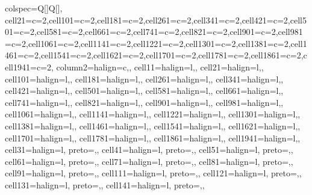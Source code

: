 \begin{table}
\centering
\begin{talltblr}[         %
caption={Technology Adoption Models:  Germany},
note{}={* p \num{< 0.1}, ** p \num{< 0.05}, *** p \num{< 0.01}},
note{ }={* p < 0.1, ** p < 0.05, *** p < 0.01},
]                     %
{                     %
colspec={Q[]Q[]},
cell{2}{1}={c=2}{},cell{10}{1}={c=2}{},cell{18}{1}={c=2}{},cell{26}{1}={c=2}{},cell{34}{1}={c=2}{},cell{42}{1}={c=2}{},cell{50}{1}={c=2}{},cell{58}{1}={c=2}{},cell{66}{1}={c=2}{},cell{74}{1}={c=2}{},cell{82}{1}={c=2}{},cell{90}{1}={c=2}{},cell{98}{1}={c=2}{},cell{106}{1}={c=2}{},cell{114}{1}={c=2}{},cell{122}{1}={c=2}{},cell{130}{1}={c=2}{},cell{138}{1}={c=2}{},cell{146}{1}={c=2}{},cell{154}{1}={c=2}{},cell{162}{1}={c=2}{},cell{170}{1}={c=2}{},cell{178}{1}={c=2}{},cell{186}{1}={c=2}{},cell{194}{1}={c=2}{},
column{2}={}{halign=c,},
cell{1}{1}={}{halign=l,},
cell{2}{1}={}{halign=l,},
cell{10}{1}={}{halign=l,},
cell{18}{1}={}{halign=l,},
cell{26}{1}={}{halign=l,},
cell{34}{1}={}{halign=l,},
cell{42}{1}={}{halign=l,},
cell{50}{1}={}{halign=l,},
cell{58}{1}={}{halign=l,},
cell{66}{1}={}{halign=l,},
cell{74}{1}={}{halign=l,},
cell{82}{1}={}{halign=l,},
cell{90}{1}={}{halign=l,},
cell{98}{1}={}{halign=l,},
cell{106}{1}={}{halign=l,},
cell{114}{1}={}{halign=l,},
cell{122}{1}={}{halign=l,},
cell{130}{1}={}{halign=l,},
cell{138}{1}={}{halign=l,},
cell{146}{1}={}{halign=l,},
cell{154}{1}={}{halign=l,},
cell{162}{1}={}{halign=l,},
cell{170}{1}={}{halign=l,},
cell{178}{1}={}{halign=l,},
cell{186}{1}={}{halign=l,},
cell{194}{1}={}{halign=l,},
cell{3}{1}={}{halign=l, preto={\hspace{1em}},},
cell{4}{1}={}{halign=l, preto={\hspace{1em}},},
cell{5}{1}={}{halign=l, preto={\hspace{1em}},},
cell{6}{1}={}{halign=l, preto={\hspace{1em}},},
cell{7}{1}={}{halign=l, preto={\hspace{1em}},},
cell{8}{1}={}{halign=l, preto={\hspace{1em}},},
cell{9}{1}={}{halign=l, preto={\hspace{1em}},},
cell{11}{1}={}{halign=l, preto={\hspace{1em}},},
cell{12}{1}={}{halign=l, preto={\hspace{1em}},},
cell{13}{1}={}{halign=l, preto={\hspace{1em}},},
cell{14}{1}={}{halign=l, preto={\hspace{1em}},},
}
\end{talltblr}
\end{table}
